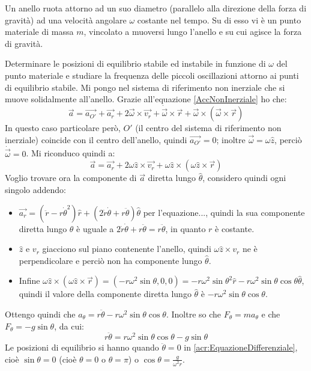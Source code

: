 \documentclass[../main.tex]{subfiles}
\begin{document}
\textex
Un anello ruota attorno ad un suo diametro (parallelo alla direzione della forza di gravità) ad una velocità
angolare $\omega$ costante nel tempo. Su di esso vi è un punto materiale di massa $m$, vincolato a muoversi lungo l'anello e su cui agisce
la forza di gravità.

Determinare le posizioni di equilibrio stabile ed instabile in funzione di $\omega$ del punto materiale e studiare la
frequenza delle piccoli oscillazioni attorno ai punti di equilibrio stabile.
\solution
Mi pongo nel sistema di riferimento non inerziale che si muove solidalmente all'anello. Grazie all'equazione 
\cref{AccNonInerziale}
ho che:
\begin{equation*}
	\overrightarrow{a}=\overrightarrow{a_{O'}}+\overrightarrow{a_r}+2\overrightarrow{\omega}\times \overrightarrow{v_r} 
	+ \dot{\overrightarrow{\omega}}\times \overrightarrow{r}+\overrightarrow{\omega}\times(\overrightarrow{\omega}
	\times\overrightarrow{r})
\end{equation*}
In questo caso particolare però, $O'$ (il centro del sistema di riferimento non inerziale) coincide con il centro
dell'anello, quindi $\overrightarrow{a_{O'}}=0$; inoltre $\overrightarrow{\omega}=\omega \hat{z}$, perciò
$\dot{\overrightarrow{\omega}}=0$. Mi riconduco quindi a:
\begin{equation*}
	\overrightarrow{a}=\overrightarrow{a_r}+2\omega\hat{z}\times \overrightarrow{v_r} 
	+\omega\hat{z}\times(\omega\hat{z}\times\overrightarrow{r})
\end{equation*}
Voglio trovare ora la componente di $\overrightarrow{a}$ diretta lungo $\hat{\theta}$, considero quindi ogni singolo
addendo:
\begin{itemize}
	\item	$\overrightarrow{a_r}=(\ddot{r}-r\dot{\theta}^2)\hat{r}+(2\dot{r}\dot{\theta}+r\ddot{\theta})\hat{\theta}$
			per l'equazione..., quindi la sua componente diretta lungo $\theta$ è uguale a $
			2\dot{r}\dot{\theta}+r\ddot{\theta}=r\ddot{\theta}$, in quanto $r$ è costante.
	\item	$\hat{z}$ e $v_r$ giacciono sul piano contenente l'anello, quindi $\omega\hat{z}\times v_r$ ne è perpendicolare
			e perciò non ha componente lungo $\hat{\theta}$.
	\item	Infine $\omega\hat{z}\times(\omega\hat{z}\times\overrightarrow{r})=
			(-r\omega^2\sin\theta,0,0)=-r\omega^2\sin\theta^2\hat{r}-r\omega^2\sin\theta\cos\theta\hat{\theta}$,
			quindi il valore della componente diretta lungo $\hat\theta$ è $-r\omega^2\sin\theta\cos\theta$.
\end{itemize}
Ottengo quindi che $a_\theta=r\ddot{\theta}-r\omega^2\sin\theta\cos\theta$.
Inoltre so che $F_\theta=m a_\theta$ e che $F_\theta=-g\sin\theta$, da cui:
\begin{equation}\label{acr:EquazioneDifferenziale}
	r\ddot{\theta}=r\omega^2\sin\theta\cos\theta-g\sin\theta
\end{equation}
Le posizioni di equilibrio si hanno quando $\ddot\theta=0$ in \cref{acr:EquazioneDifferenziale}, cioè
$\sin\theta=0$ (cioè $\theta=0$ o $\theta=\pi$) o $\cos\theta=\frac{g}{\omega^2r}$. 
\end{document}
